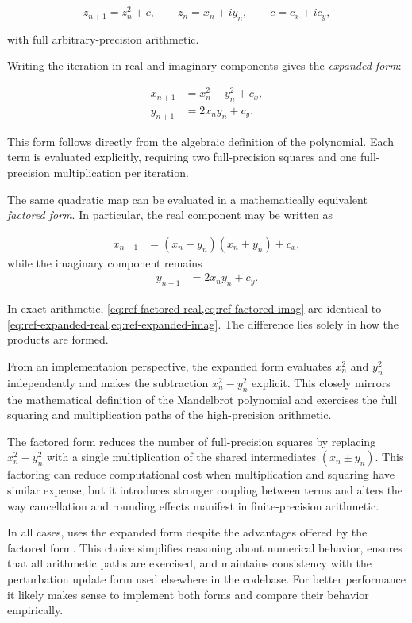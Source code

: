 \[
z_{n+1} = z_n^2 + c,
\qquad
z_n = x_n + i y_n,
\qquad
c = c_x + i c_y,
\]

with full arbitrary-precision arithmetic.

Writing the iteration in real and imaginary components gives the
\emph{expanded form}:

\begin{align}
x_{n+1} &= x_n^2 - y_n^2 + c_x, \label{eq:ref-expanded-real} \\
y_{n+1} &= 2 x_n y_n + c_y. \label{eq:ref-expanded-imag}
\end{align}

This form follows directly from the algebraic definition of the polynomial.
Each term is evaluated explicitly, requiring two full-precision squares and
one full-precision multiplication per iteration.

The same quadratic map can be evaluated in a mathematically equivalent
\emph{factored form}. In particular, the real component may be written as

\begin{align}
x_{n+1}
&= (x_n - y_n)(x_n + y_n) + c_x, \label{eq:ref-factored-real}
\end{align}
while the imaginary component remains
\begin{align}
y_{n+1} &= 2 x_n y_n + c_y. \label{eq:ref-factored-imag}
\end{align}

In exact arithmetic, \cref{eq:ref-factored-real,eq:ref-factored-imag} are
identical to \cref{eq:ref-expanded-real,eq:ref-expanded-imag}. The difference
lies solely in how the products are formed.

From an implementation perspective, the expanded form evaluates
$x_n^2$ and $y_n^2$ independently and makes the subtraction
$x_n^2 - y_n^2$ explicit. This closely mirrors the mathematical definition
of the Mandelbrot polynomial and exercises the full squaring and
multiplication paths of the high-precision arithmetic.

The factored form reduces the number of full-precision squares by replacing
$x_n^2 - y_n^2$ with a single multiplication of the shared intermediates
$(x_n \pm y_n)$. This factoring can reduce computational cost when multiplication and
squaring have similar expense, but it introduces stronger coupling between
terms and alters the way cancellation and rounding effects manifest in
finite-precision arithmetic.

In all cases, \FractalShark{} uses the expanded form despite the advantages offered
by the factored form. This choice simplifies reasoning about numerical behavior,
ensures that all arithmetic paths are exercised, and maintains consistency with
the perturbation update form used elsewhere in the codebase.  For better
performance it likely makes sense to implement both forms and compare their behavior
empirically.

